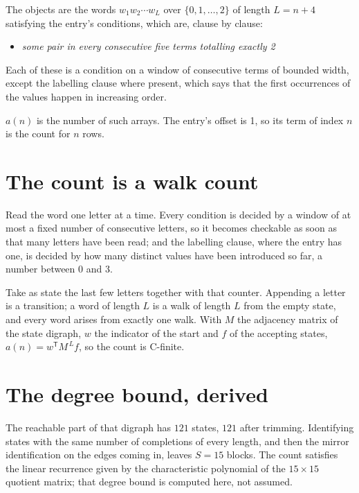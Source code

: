 \documentclass[11pt]{article}
\theoremstyle{definition}
\begin{document}
The objects are the words $w_1 w_2 \cdots w_L$ over $\{0,1,\dots,2\}$ of length $L = n + 4$ satisfying the entry's conditions, which are, clause by clause:

\begin{itemize}

\item {\itshape some pair in every consecutive five terms totalling exactly 2}

\end{itemize}

Each of these is a condition on a window of consecutive terms of bounded width, except the labelling clause where present, which says that the first occurrences of the values happen in increasing order.

$a(n)$ is the number of such arrays. The entry's offset is 1, so its term of index $n$ is the count for $n$ rows.

\section{The count is a walk count}

Read the word one letter at a time. Every condition is decided by a window of at most a fixed number of consecutive letters, so it becomes checkable as soon as that many letters have been read; and the labelling clause, where the entry has one, is decided by how many distinct values have been introduced so far, a number between $0$ and 3.

Take as state the last few letters together with that counter. Appending a letter is a transition; a word of length $L$ is a walk of length $L$ from the empty state, and every word arises from exactly one walk. With $M$ the adjacency matrix of the state digraph, $w$ the indicator of the start and $f$ of the accepting states, $a(n) = w^{\mathsf T}M^{\,L}f$, so the count is C-finite.

\section{The degree bound, derived}

The reachable part of that digraph has $121$ states, $121$ after trimming. Identifying states with the same number of completions of every length, and then the mirror identification on the edges coming in, leaves $S = 15$ blocks. The count satisfies the linear recurrence given by the characteristic polynomial of the $15\times15$ quotient matrix; that degree bound is computed here, not assumed.
\end{document}

